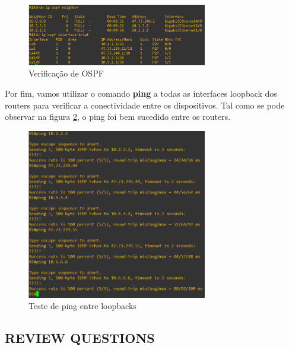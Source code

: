 \documentclass[11pt,english, openright, oneside]{book}
\begin{document}
\begin{figure}[H]
  \centering
  \includegraphics[width=0.70\textwidth]{imagens/Tarefa1/2.showOspf.png}
  \caption{Verificação de OSPF}
  \label{fig:showOspf}
\end{figure}
\vspace{0.2cm}

\newpage
Por fim, vamos utilizar o comando \textbf{ping} a todas as interfaces loopback dos routers para verificar a conectividade entre os dispositivos. Tal como se pode observar na figura \ref{fig:pingLoopback}, o ping foi bem sucedido entre os routers.
\vspace{0.2cm}

\begin{figure}[H]
  \centering
  \includegraphics[width=0.70\textwidth]{imagens/Tarefa1/2.pingLoopback.png}
  \caption{Teste de ping entre loopbacks}
  \label{fig:pingLoopback}
\end{figure}
\vspace{0.2cm}

\subsection{REVIEW QUESTIONS}
\vspace{0.2cm}
\end{document}
